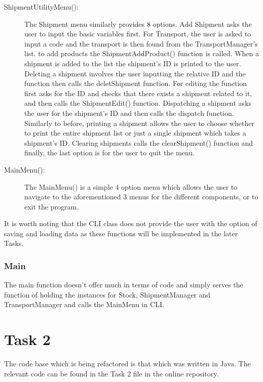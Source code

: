 \documentclass[12pt, a4paper]{report}
\begin{document}
\begin{description}
   \item [ShipmentUtilityMenu():] The Shipment menu similarly provides 8 options. Add Shipment asks the user to input the basic variables first. For Transport, the user is asked to input a code and the transport is then found from the TransportManager's list. to add products the ShipmentAddProduct() function is called. When a shipment is added to the list the shipment's ID is printed to the user. Deleting a shipment involves the user inputting the relative ID and the function then calls the deletShipment function. For editing the function first asks for the ID and checks that there exists a shipment related to it, and then calls the ShipmentEdit() function. Dispatching a shipment asks the user for the shipment's ID and then calls the dispatch function. Similarly to before, printing a shipment allows the user to choose whether to print the entire shipment list or just a single shipment which takes a shipment's ID. Clearing shipments calls the clearShipment() function and finally, the last option is for the user to quit the menu.
   
   \item [MainMenu():] The MainMenu() is a simple 4 option menu which allows the user to navigate to the aforementioned 3 menus for the different components, or to exit the program.
\end{description}

It is worth noting that the CLI class does not provide the user with the option of saving and loading data as these functions will be implemented in the later Tasks.

\subsection{Main}
The main function doesn't offer much in terms of code and simply serves the function of holding the instances for Stock, ShipmentManager and TransportManager and calls the MainMenu in CLI.

\chapter{Task 2}
The code base which is being refactored is that which was written in Java. The relevant code can be found in the Task 2 file in the online repository.
\end{document}
